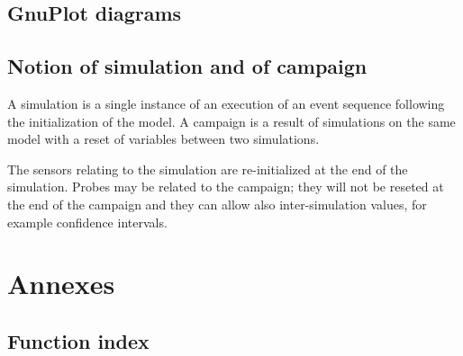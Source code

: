 \documentclass{book}
\begin{document}
%

%
%
%
%
%
%
%
%
%


\section{GnuPlot diagrams}
\label{section:gnuplot}

%

\section{Notion of simulation and of campaign}

A simulation is a single instance of an execution of an event sequence
following the initialization of the model. A campaign is a
result of simulations on the same model with a reset of
variables between two simulations.

    The sensors relating to the simulation are re-initialized at the end of the
simulation. Probes may be related to the campaign; they will not be reseted at the end of the campaign and they can allow also inter-simulation values​​, for example confidence intervals.

%
%
\chapter{Annexes}

\section{Function index}

\printindex
\end{document}
